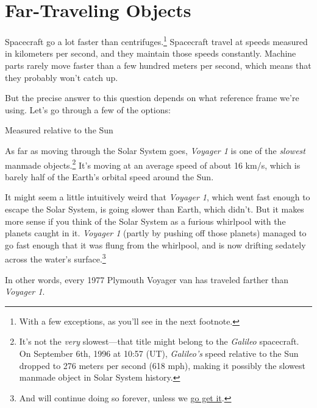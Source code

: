 {{
\chapter{Far-Traveling Objects}
}

\hfill{}

{Spacecraft go a lot faster than centrifuges.{\footnote{With a few exceptions, as you'll see in the next footnote.} } Spacecraft travel at speeds measured in kilometers per second, and they maintain those speeds constantly. Machine parts rarely move faster than a few hundred meters per second, which means that they probably won't catch up.}

{But the precise answer to this question depends on what reference frame we're using. Let's go through a few of the options:}

{Measured relative to the Sun}

{As far as moving through the Solar System goes, \emph{Voyager 1} is one of the \emph{slowest} manmade objects.{\footnote{It's not the \emph{very} slowest—that title might belong to the \emph{Galileo} spacecraft. On September 6th, 1996 at 10:57 (UT), \emph{Galileo's} speed relative to the Sun dropped to 276 meters per second (618 mph), making it possibly the slowest manmade object in Solar System history.} } It's moving at an average speed of about 16 km/s, which is barely half of the Earth's orbital speed around the Sun.}

{It might seem a little intuitively weird that \emph{Voyager 1}, which went fast enough to escape the Solar System, is going slower than Earth, which didn't. But it makes more sense if you think of the Solar System as a furious whirlpool with the planets caught in it. \emph{Voyager 1} (partly by pushing off those planets) managed to go fast enough that it was flung from the whirlpool, and is now drifting sedately across the water's surface.{\footnote{And will continue doing so forever, unless we \href{http://what-if.xkcd.com/38/}{go get it}.} } }

{In other words, every 1977 Plymouth Voyager van has traveled farther than \emph{Voyager 1}.}

}
